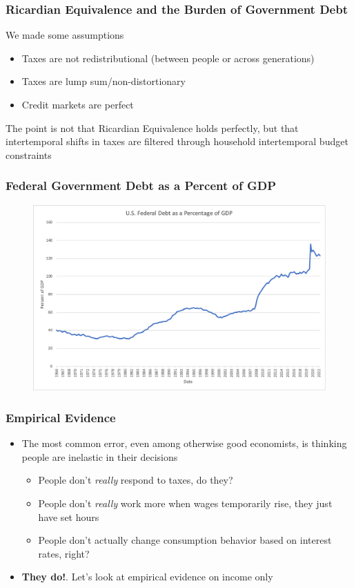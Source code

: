 \documentclass{beamer}
\begin{document}
\begin{frame}
\frametitle[alignment=center]{Ricardian Equivalence and the Burden of Government Debt}
 We made some assumptions
\begin{itemize}
\item Taxes are not redistributional (between people or across generations)
\bigskip
\item Taxes are lump sum/non-distortionary
\bigskip
\item Credit markets are perfect
\end{itemize}
The point is not that Ricardian Equivalence holds perfectly, but that intertemporal shifts in taxes are filtered through household intertemporal budget constraints
\end{frame}


\begin{frame}
\frametitle[alignment=center]{Federal Government Debt as a Percent of GDP}
\begin{figure}
\centering
\includegraphics[scale=0.45]{Figures/FedDebt.png}
\end{figure}
\end{frame}

\begin{frame}
\frametitle[alignment=center]{Empirical Evidence}
\begin{itemize}
\item The most common error, even among otherwise good economists, is thinking people are inelastic in their decisions
\bigskip
\begin{itemize}
\item People don't \emph{really} respond to taxes, do they?
\bigskip
\item People don't \emph{really} work more when wages temporarily rise, they just have set hours
\bigskip
\item People don't actually change consumption behavior based on interest rates, right?
\end{itemize}
\item \textbf{They do!}. Let's look at empirical evidence on income only \bigskip
\end{itemize}
\end{frame}
\end{document}
